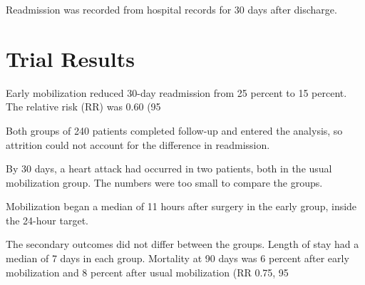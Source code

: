 \documentclass{article}
\begin{document}
Readmission was recorded from hospital records for 30 days after discharge.

\section{Trial Results}

Early mobilization reduced 30-day readmission from 25 percent to 15 percent. The relative risk (RR) was 0.60 (95%

Both groups of 240 patients completed follow-up and entered the analysis, so attrition could not account for the difference in readmission.

By 30 days, a heart attack had occurred in two patients, both in the usual mobilization group. The numbers were too small to compare the groups.

Mobilization began a median of 11 hours after surgery in the early group, inside the 24-hour target.

The secondary outcomes did not differ between the groups. Length of stay had a median of 7 days in each group. Mortality at 90 days was 6 percent after early mobilization and 8 percent after usual mobilization (RR 0.75, 95%


\end{document}
